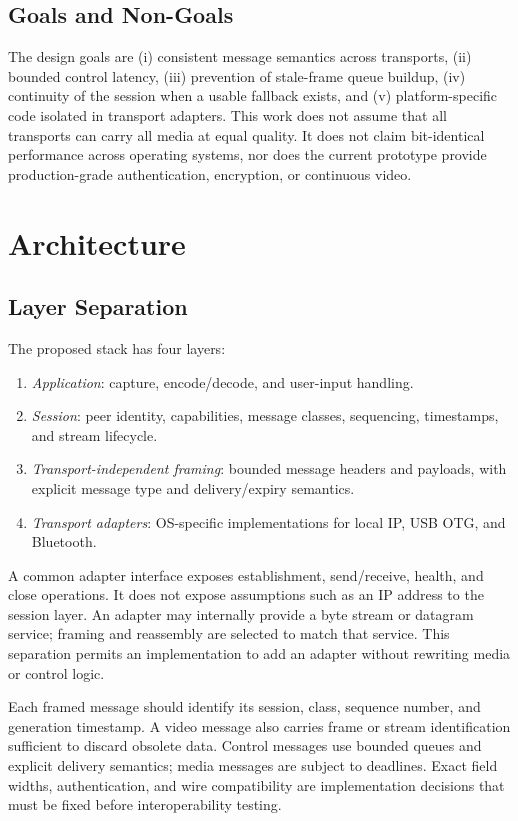 \documentclass[conference]{IEEEtran}
\begin{document}
\subsection{Goals and Non-Goals}
The design goals are (i) consistent message semantics across transports,
(ii) bounded control latency, (iii) prevention of stale-frame queue buildup,
(iv) continuity of the session when a usable fallback exists, and (v)
platform-specific code isolated in transport adapters. This work does not
assume that all transports can carry all media at equal quality. It does not
claim bit-identical performance across operating systems, nor does the
current prototype provide production-grade authentication, encryption, or
continuous video.

\section{Architecture}
\subsection{Layer Separation}
The proposed stack has four layers:
\begin{enumerate}
  \item \textit{Application}: capture, encode/decode, and user-input handling.
  \item \textit{Session}: peer identity, capabilities, message classes,
  sequencing, timestamps, and stream lifecycle.
  \item \textit{Transport-independent framing}: bounded message headers and
  payloads, with explicit message type and delivery/expiry semantics.
  \item \textit{Transport adapters}: OS-specific implementations for local
  IP, USB OTG, and Bluetooth.
\end{enumerate}
A common adapter interface exposes establishment, send/receive, health, and
close operations. It does not expose assumptions such as an IP address to
the session layer. An adapter may internally provide a byte stream or
datagram service; framing and reassembly are selected to match that service.
This separation permits an implementation to add an adapter without
rewriting media or control logic.

Each framed message should identify its session, class, sequence number, and
generation timestamp. A video message also carries frame or stream
identification sufficient to discard obsolete data. Control messages use
bounded queues and explicit delivery semantics; media messages are subject to
deadlines. Exact field widths, authentication, and wire compatibility are
implementation decisions that must be fixed before interoperability testing.
\end{document}
